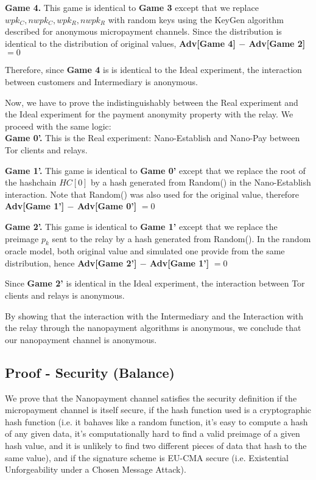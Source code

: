 \textbf{Game 4.} This game is identical to \textbf{Game 3} except that we replace $wpk_C, nwpk_C, wpk_R, nwpk_R$ with random keys using the KeyGen algorithm described for anonymous micropayment channels. Since the distribution is identical to the distribution of original values, \textbf{Adv[Game 4] $-$ Adv[Game 2]} $= 0$

Therefore, since \textbf{Game 4} is is identical to the Ideal experiment, the interaction between customers and Intermediary is anonymous.

Now, we have to prove the indistinguishably between the Real experiment and the Ideal experiment for the payment anonymity property with the relay.  We proceed with the same logic:\\

\textbf{Game 0'.} This is the Real experiment: Nano-Establish and Nano-Pay between  Tor clients and relays.

\textbf{Game 1'.} This game is identical to \textbf{Game 0'} except that we replace the root of the hashchain $HC[0]$ by a hash generated from Random() in the Nano-Establish interaction. Note that Random() was also used for the original value, therefore \textbf{Adv[Game 1'] $-$ Adv[Game 0']} $= 0$

\textbf{Game 2'.} This game is identical to \textbf{Game 1'} except that we replace the preimage $p_k$ sent to the relay by a hash generated from Random(). In the random oracle model, both original value and simulated one provide from the same distribution, hence \textbf{Adv[Game 2'] $-$ Adv[Game 1']} $= 0$

Since \textbf{Game 2'} is identical in the Ideal experiment, the interaction between Tor clients and relays is anonymous.

By showing that the interaction with the Intermediary and the Interaction with the relay through the nanopayment algorithms is anonymous, we conclude that our nanopayment channel is anonymous.

\subsection{Proof - Security (Balance)}

We prove that the Nanopayment channel satisfies the security definition if the micropayment channel is itself secure, if the hash function used is a cryptographic hash function (i.e. it bahaves like a random function, it's easy to compute a hash of any given data, it's computationally hard to find a valid preimage of a given hash value, and it is unlikely to find two different pieces of data that hash to the same value), and if the signature scheme is EU-CMA secure (i.e. Existential Unforgeability under a Chosen Message Attack).

